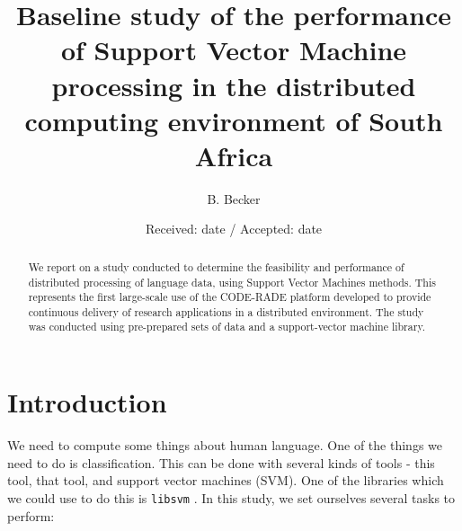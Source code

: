 \documentclass[smallcondensed]{svjour3}     %
\begin{document}
\title{Baseline study of the performance of Support Vector Machine processing in the distributed computing environment of South Africa
}


\author{B. Becker %
}



\date{Received: date / Accepted: date}


\maketitle

\begin{abstract}
We report on a study conducted to determine the feasibility and performance of distributed processing of language data, using Support Vector Machines methods. This represents the first large-scale use of the CODE-RADE platform developed to provide continuous delivery of research applications in a distributed environment. The study was conducted using pre-prepared sets of data and a support-vector machine library.

\end{abstract}

\section{Introduction}
\label{intro}
We need to compute some things about human language. One of the things we need to do is classification. This can be done with several kinds of tools - this tool, that tool, and support vector machines (SVM). One of the libraries which we could use to do this is \texttt{libsvm} \cite{Chang2011LIBSVMMachines.}.
In this study, we set ourselves several tasks to perform:
\end{document}
